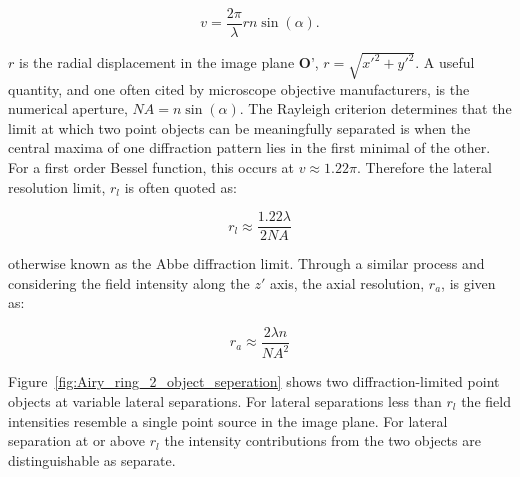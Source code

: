 \begin{equation}\label{eq:normalised_lateral}
v = \frac{2\pi}{\lambda}rn\sin(\alpha).
\end{equation}

$r$ is the radial displacement in the image plane $\textbf{O'}$, $r = \sqrt{x'^{2} + y'^{2}}$. 
A useful quantity, and one often cited by microscope objective manufacturers, 
is the numerical aperture, $NA = n\sin(\alpha)$. The Rayleigh criterion 
determines that the limit at which two point objects can be meaningfully 
separated is when the central maxima of one diffraction pattern lies in the
first minimal of the other\cite{rayleigh1874xii,rayleigh1880investigations}. For a first order Bessel 
function, this occurs at $v \approx 1.22\pi$. Therefore the lateral resolution 
limit, $r_l$ is often quoted as:

\begin{equation}\label{eq:lateral_res}
r_l \approx \frac{1.22\lambda}{2NA}
\end{equation}

otherwise known as the Abbe diffraction limit\cite{abbe1873beitrage}. Through
a similar process and considering the field intensity along the $z'$ axis, the
axial resolution, $r_a$, is given as\cite{pawley2006handbook}:

\begin{equation}\label{eq:axial_res}
r_a \approx \frac{2\lambda n}{NA^{2}}
\end{equation}

Figure~\ref{fig:Airy_ring_2_object_seperation} shows two 
diffraction-limited point objects at variable lateral separations. For 
lateral separations less than $r_{l}$ the field intensities resemble a single 
point source in the image plane. For lateral separation at or above $r_{l}$ 
the intensity contributions from the two objects are distinguishable as 
separate.

